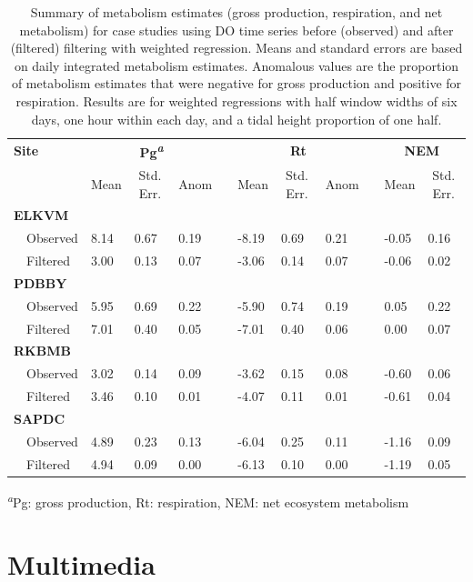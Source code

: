 \documentclass[letterpaper,12pt,oneside]{article}\usepackage[]{graphicx}\usepackage[]{color}
\begin{document}
\begin{table}[!tbp]
\caption{Summary of metabolism estimates (gross production, respiration, and net metabolism) for case studies using \ac{DO} time series before (observed) and after (filtered) filtering with weighted regression.  Means and standard errors are based on daily integrated metabolism estimates.  Anomalous values are the proportion of metabolism estimates that were negative for gross production and positive for respiration.  Results are for weighted regressions with half window widths of six days, one hour within each day, and a tidal height proportion of one half.\label{tab:case_res}} 
\begin{center}
\begin{tabular}{llllclllcll}
\hline\hline
\multicolumn{1}{l}{\bfseries Site}&\multicolumn{3}{c}{\bfseries Pg\textsuperscript{\textit{a}}}&\multicolumn{1}{c}{\bfseries }&\multicolumn{3}{c}{\bfseries Rt}&\multicolumn{1}{c}{\bfseries }&\multicolumn{2}{c}{\bfseries NEM}\tabularnewline
\cline{2-4} \cline{6-8} \cline{10-11}
\multicolumn{1}{l}{}&\multicolumn{1}{c}{Mean}&\multicolumn{1}{c}{Std. Err.}&\multicolumn{1}{c}{Anom}&\multicolumn{1}{c}{}&\multicolumn{1}{c}{Mean}&\multicolumn{1}{c}{Std. Err.}&\multicolumn{1}{c}{Anom}&\multicolumn{1}{c}{}&\multicolumn{1}{c}{Mean}&\multicolumn{1}{c}{Std. Err.}\tabularnewline
\hline
{\bfseries ELKVM}&&&&&&&&&&\tabularnewline
~~Observed&8.14&0.67&0.19&&-8.19&0.69&0.21&&-0.05&0.16\tabularnewline
~~Filtered&3.00&0.13&0.07&&-3.06&0.14&0.07&&-0.06&0.02\tabularnewline
\hline
{\bfseries PDBBY}&&&&&&&&&&\tabularnewline
~~Observed&5.95&0.69&0.22&&-5.90&0.74&0.19&& 0.05&0.22\tabularnewline
~~Filtered&7.01&0.40&0.05&&-7.01&0.40&0.06&& 0.00&0.07\tabularnewline
\hline
{\bfseries RKBMB}&&&&&&&&&&\tabularnewline
~~Observed&3.02&0.14&0.09&&-3.62&0.15&0.08&&-0.60&0.06\tabularnewline
~~Filtered&3.46&0.10&0.01&&-4.07&0.11&0.01&&-0.61&0.04\tabularnewline
\hline
{\bfseries SAPDC}&&&&&&&&&&\tabularnewline
~~Observed&4.89&0.23&0.13&&-6.04&0.25&0.11&&-1.16&0.09\tabularnewline
~~Filtered&4.94&0.09&0.00&&-6.13&0.10&0.00&&-1.19&0.05\tabularnewline
\hline
\end{tabular}\end{center}

\textsuperscript{\textit{a}}Pg: gross production, Rt: respiration, NEM: net ecosystem metabolism\end{table}


\clearpage


\raggedbottom
\raggedright
\setlength{\parindent}{0.5in}

\section{Multimedia} \label{multi}

\end{document}
